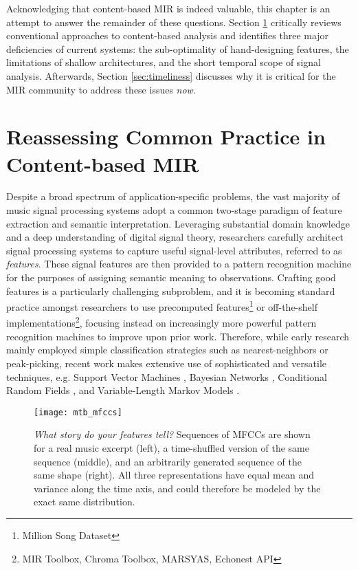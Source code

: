 Acknowledging that content-based MIR is indeed valuable, this chapter is an attempt to answer the remainder of these questions.
Section \ref{sec:common} critically reviews conventional approaches to content-based analysis and identifies three major deficiencies of current systems: the sub-optimality of hand-designing features, the limitations of shallow architectures, and the short temporal scope of signal analysis.
Afterwards, Section \ref{sec:timeliness} discusses why it is critical for the MIR community to address these issues \emph{now}.



\section{Reassessing Common Practice in Content-based MIR}
\label{sec:common}

Despite a broad spectrum of application-specific problems, the vast majority of music signal processing systems adopt a common two-stage paradigm of feature extraction and semantic interpretation.
Leveraging substantial domain knowledge and a deep understanding of digital signal theory, researchers carefully architect signal processing systems to capture useful signal-level attributes, referred to as \emph{features}.
These signal features are then provided to a pattern recognition machine for the purposes of assigning semantic meaning to observations.
Crafting good features is a particularly challenging subproblem, and it is becoming standard practice amongst researchers to use precomputed features\footnote{Million Song Dataset} or off-the-shelf implementations\footnote{MIR Toolbox, Chroma Toolbox, MARSYAS, Echonest API}, focusing instead on increasingly more powerful pattern recognition machines to improve upon prior work.
Therefore, while early research mainly employed simple classification strategies such as nearest-neighbors or peak-picking, recent work makes extensive use of sophisticated and versatile techniques, e.g. Support Vector Machines \cite{Mandel2005}, Bayesian Networks \cite{Mauch2010a}, Conditional Random Fields \cite{Sumi2012}, and Variable-Length Markov Models \cite{Chordia2011}.

\begin{figure}
\begin{centering}
\texttt{[image: mtb\_mfccs]}
\caption{\emph{What story do your features tell?} Sequences of MFCCs are shown for a real music excerpt (left), a time-shuffled version of the same sequence (middle), and an arbitrarily generated sequence of the same shape (right). All three representations have equal mean and variance along the time axis, and could therefore be modeled by the exact same distribution.}
\label{fig:mfccs}
\end{centering}
\end{figure}

